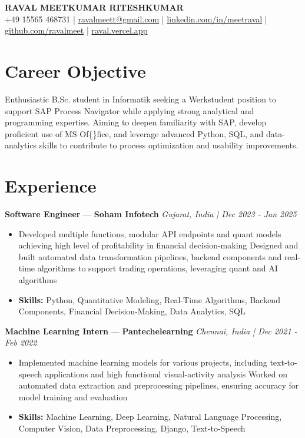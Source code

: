 \documentclass[a4paper,10pt]{article}
\begin{document}
\begin{center}
  {\Large\bfseries RAVAL MEETKUMAR RITESHKUMAR}\\[2pt]
  {\small +49 15565 468731 \;|\; \href{mailto:ravalmeett@gmail.com}{ravalmeett@gmail.com} \;|\; \href{https://www.linkedin.com/in/meetraval/}{linkedin.com/in/meetraval} \;|\; \href{https://github.com/ravalmeet}{github.com/ravalmeet} \;|\; \href{https://raval.vercel.app/}{raval.vercel.app}}
\end{center}
\vspace{-3pt}

\section*{Career Objective}
Enthusiastic B.Sc. student in Informatik seeking a Werkstudent position to support SAP Process Navigator while applying strong analytical and programming expertise. Aiming to deepen familiarity with SAP, develop proficient use of MS Of\{\}fice, and leverage advanced Python, SQL, and data-analytics skills to contribute to process optimization and usability improvements.\par

\section*{Experience}
\textbf{Software Engineer} — \textbf{Soham Infotech} \hfill \textit{Gujarat, India \;|\; Dec 2023 - Jan 2025}\par
\vspace{1pt}
\begin{itemize}
  \item Developed multiple functions, modular API endpoints and quant models achieving high level of profitability in financial decision-making Designed and built automated data transformation pipelines, backend components and real-time algorithms to support trading operations, leveraging quant and AI algorithms
  \item \textbf{Skills:} Python, Quantitative Modeling, Real-Time Algorithms, Backend Components, Financial Decision-Making, Data Analytics, SQL
\end{itemize}
\vspace{3pt}
\textbf{Machine Learning Intern} — \textbf{Pantechelearning} \hfill \textit{Chennai, India \;|\; Dec 2021 - Feb 2022}\par
\vspace{1pt}
\begin{itemize}
  \item Implemented machine learning models for various projects, including text-to-speech applications and high functional visual-activity analysis Worked on automated data extraction and preprocessing pipelines, ensuring accuracy for model training and evaluation
  \item \textbf{Skills:} Machine Learning, Deep Learning, Natural Language Processing, Computer Vision, Data Preprocessing, Django, Text-to-Speech
\end{itemize}
\end{document}
